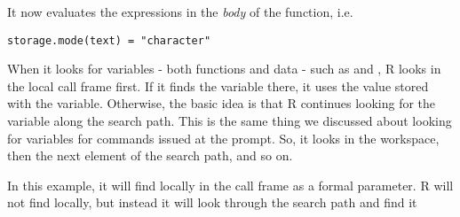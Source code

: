 \noindent It now evaluates the expressions in the {\em{body}} of the
function, i.e. 
\begin{verbatim}
storage.mode(text) = "character"
\end{verbatim}
When it looks for variables - both functions and data - such as
 and , R looks in the local
call frame first. If it finds the variable there, it uses the value
stored with the variable. Otherwise, the basic idea is that R
continues looking for the variable along the search path. This is the
same thing we discussed about looking for variables for commands
issued at the prompt. So, it looks in the workspace, then the next
element of the search path, and so on.

In this example, it will find  locally in the call
frame as a formal parameter. R will not find 
locally, but instead it will look through the search path and find it
